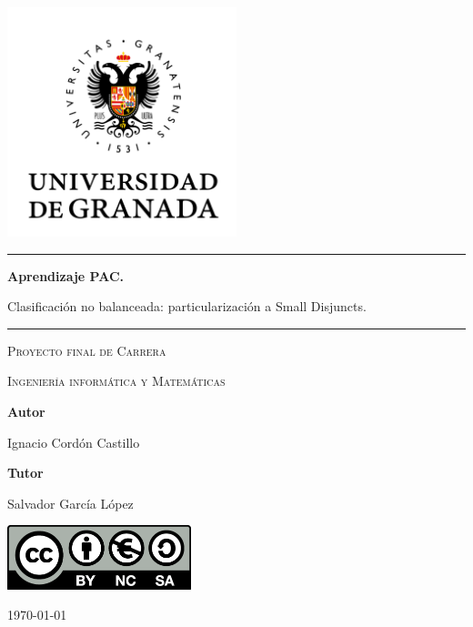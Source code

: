 
\begin{titlepage}
	\centering
	\includegraphics[width=0.5\textwidth]{./imgs/ugr.png}\par
	\vspace{1cm}
        \rule{\textwidth}{0.3em}\hfill
        {\huge\bfseries 
	  Aprendizaje PAC. \par
	  Clasificación no balanceada:
	  particularización a Small Disjuncts.\par}
        \rule{\textwidth}{0.3em}\hfill
	\vspace{1cm}
        {\scshape Proyecto final de Carrera\par}
        {\scshape Ingeniería informática y Matemáticas\par}
        \vfill
        {\bf Autor \par}
	{Ignacio Cordón Castillo \par}
	{\bf Tutor \par}
	{Salvador García López \par}
	\vfill
      	\includegraphics[width=0.4\textwidth]{./imgs/by-nc-sa.png}\par
	{\large \today\par}
\end{titlepage}